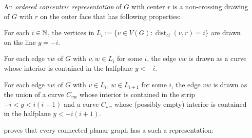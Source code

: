 \documentclass{patmorin}
\newcommand{\defin}[1]{\emph{\textcolor{brightmaroon}{#1}}}
\DeclareMathOperator{\dist}{dist}
\begin{document}
%



An \defin{ordered concentric representation} of $G$ with center $r$ is a non-crossing drawing of $G$ with $r$ on the outer face that has following properties:
\begin{compactenum}[(i)]
  \item For each $i\in\mathbb{N}$, the vertices in $L_i:=\{v\in V(G):\dist_G(v,r)=i\}$ are drawn on the line $y=-i$.
  \item For each edge $vw$ of $G$ with $v,w\in L_i$ for some $i$, the edge $vw$ is drawn as a curve whose interior is contained in the halfplane $y<-i$.
  \item For each edge $vw$ of $G$ with $v\in L_i$, $w\in L_{i+1}$ for some $i$, the edge $vw$ is drawn as the union of a curve $C_{vw}$ whose interior is contained in the strip $-i< y<i(i+1)$ and a curve $C_{wv}$ whose (possibly empty) interior is contained in the halfplane $y<-i(i+1)$.
\end{compactenum}

\citet{pupyrev:mixed} proves that every connected planar graph has a such a representation:
\end{document}
